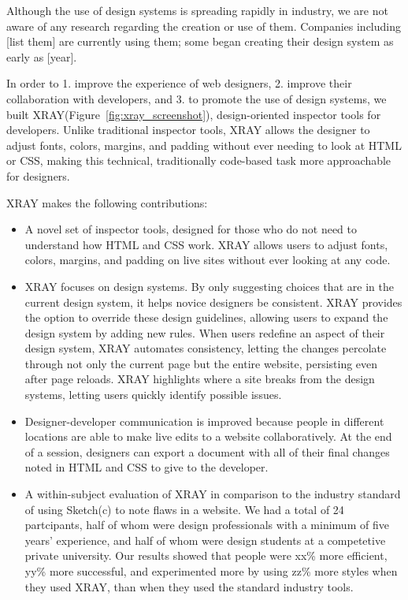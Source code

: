 \documentclass{sigchi}
\newcommand{\xray}{XRAY\xspace}
\begin{document}
Although the use of design systems is spreading rapidly in industry, we are not aware of any research regarding the creation or use of them. Companies including [list them] are currently using them; some began creating their design system as early as [year]. 

In order to 1. improve the experience of web designers, 2. improve their collaboration with developers, and 3. to promote the use of design systems, we built \xray (Figure~\ref{fig:xray_screenshot}), design-oriented inspector tools for developers. Unlike traditional inspector tools, \xray allows the designer to adjust fonts, colors, margins, and padding without ever needing to look at HTML or CSS, making this technical, traditionally code-based task more approachable for designers. 


\xray makes the following contributions: 

\begin{itemize}
    \item A novel set of inspector tools, designed for those who do not need to understand how HTML and CSS work. \xray allows users to adjust fonts, colors, margins, and padding on live sites without ever looking at any code. 
    
    \item \xray focuses on design systems. By only suggesting choices that are in the current design system, it helps novice designers be consistent. \xray provides the option to override these design guidelines, allowing users to expand the design system by adding new rules. When users redefine an aspect of their design system, \xray automates consistency, letting the changes percolate through not only the current page but the entire website, persisting even after page reloads. \xray highlights where a site breaks from the design systems, letting users quickly identify possible issues. 
    
    \item Designer-developer communication is improved because people in different locations are able to make live edits to a website collaboratively. At the end of a session, designers can export a document with all of their final changes noted in HTML and CSS to give to the developer.  
    
    \item A within-subject evaluation of \xray in comparison to the industry standard of using Sketch(c) to note flaws in a website. We had a total of 24 partcipants, half of whom were design professionals with a minimum of five years' experience, and half of whom were design students at a competetive private university. Our results showed that people were xx\% more efficient, yy\% more successful, and experimented more by using zz\% more styles when they used \xray, than when they used the standard industry tools.
\end{itemize}
\end{document}
